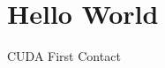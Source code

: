 \documentclass[handout]{beamer}
\begin{document}
\section{Hello World}
\begin{frame}[fragile]{CUDA First Contact}

\end{frame}


%
%
%

%
%
%
\end{document}
